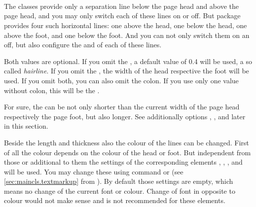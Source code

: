 \begin{Declaration}
  \\
  \\
  \\
\end{Declaration}
%
%
%
%
The \KOMAScript{} classes provide only a separation line below the page head
and above the page head, and you may only switch each of these lines on or
off. But package  provides four such horizontal
lines: one above the head, one below the head, one above the foot, and one
below the foot. And you can not only switch them on an off, but also configure
the  and  of each of these lines.

Both values are optional. If you omit the , a default value
of 0.4 will be used, a so called \emph{hairline}. If you omit the
, the width of the head respective the foot will be used. If you
omit both, you can also omit the colon. If you use only one value without
colon, this will be the .

For sure, the  can be not only shorter than the current width of
the page head respectively the page foot, but also longer. See additionally
options ,
, and 
later in this section.

%
%
%
%
Beside the length and thickness also the colour of the lines can be
changed. First of all the colour depends on the colour of the head or
foot. But independent from those or additional to them the settings of the
corresponding elements , ,
, and  will be used. You may
change these using command  or  (see
\autoref{sec:maincls.textmarkup} from
). By default those settings are
empty, which means no change of the current font or colour. Change of font in
opposite to colour would not make sense and is not recommended for these
elements.%
%
%
%
%

